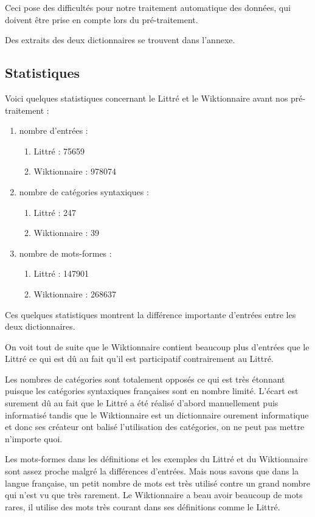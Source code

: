 Ceci pose des difficultés pour notre traitement automatique des données, qui 
doivent être prise en compte lors du pré-traitement.

Des extraits des deux dictionnaires se trouvent dans l'annexe.

\subsection{Statistiques}

Voici quelques statistiques concernant le Littré et le Wiktionnaire avant nos 
pré-traitement :

\begin{enumerate}
 \item {nombre d'entrées :
	\begin{enumerate}
	 \item Littré : 75659
	 \item Wiktionnaire : 978074
	\end{enumerate}
	}
 \item {nombre de catégories syntaxiques :
	\begin{enumerate}
	 \item Littré : 247
	 \item Wiktionnaire : 39
	\end{enumerate}
	}
 \item {nombre de mots-formes :
	\begin{enumerate}
	 \item Littré : 147901
	 \item Wiktionnaire : 268637
	\end{enumerate}
	}
\end{enumerate}

Ces quelques statistiques montrent la différence importante d'entrées entre les 
deux dictionnaires.

On voit tout de suite que le Wiktionnaire contient beaucoup plus d'entrées que 
le Littré ce qui est dû au fait qu'il est participatif contrairement au Littré.

Les nombres de catégories sont totalement opposés ce qui est très étonnant 
puisque les catégories syntaxiques françaises sont en nombre limité. L'écart 
est surement dû au fait que le Littré a été réalisé d'abord manuellement puis 
informatisé tandis que le Wiktionnaire est un dictionnaire ourement informatique 
et donc ses créateur ont balisé l'utilisation des catégories, on ne peut pas 
mettre n'importe quoi.

Les mots-formes dans les définitions et les exemples du Littré et du 
Wiktionnaire sont assez proche malgré la différences d'entrées. Mais nous savons 
que dans la langue française, un petit nombre de mots est très utilisé contre 
un grand nombre qui n'est vu que très rarement. Le Wiktionnaire a beau avoir 
beaucoup de mots rares, il utilise des mots très courant dans ses définitions 
comme le Littré.
